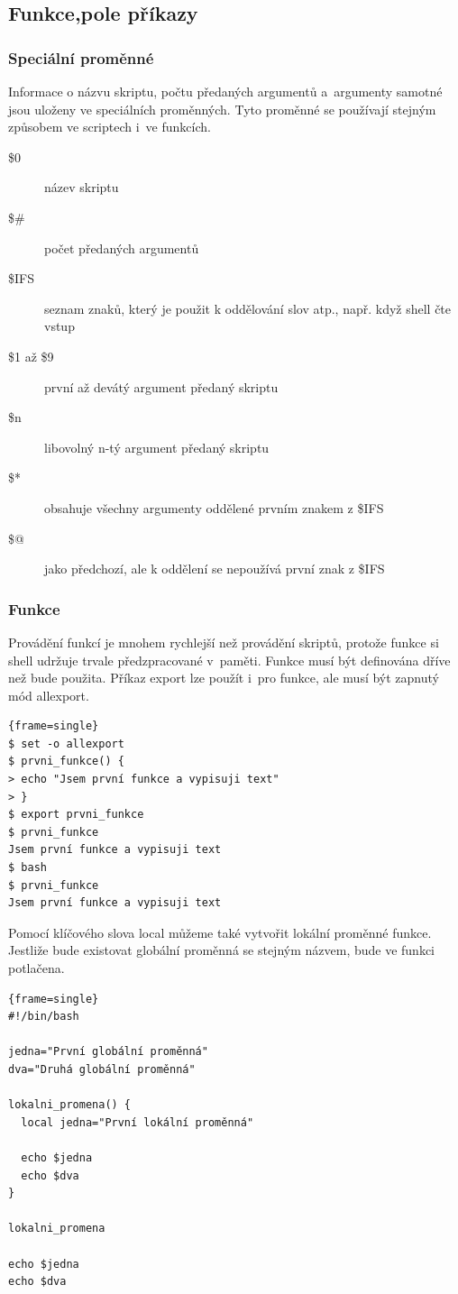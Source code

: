 \documentclass[a4paper,12pt]{article}
\newenvironment{codeframe}{%
  \begin{Sbox} 
    \begin{minipage} 
      {\columnwidth-\leftmargin-\rightmargin-2\fboxsep-2\fboxrule-4pt} 
}{%

  \end{minipage} 
  \end{Sbox} 
  \begin{center} 
    \fcolorbox{black}{codeback}{\TheSbox} 
  \end{center} 
}
\begin{document}
\subsection{Funkce,pole příkazy}
\subsubsection{Speciální proměnné}
Informace o názvu skriptu, počtu předaných argumentů a~argumenty samotné jsou uloženy ve speciálních proměnných. Tyto proměnné se používají stejným způsobem ve scriptech i~ve funkcích\cite{ABC_SBASH}.
\begin{description}
 \item[\$0] název skriptu
 \item[\$\#] počet předaných argumentů
 \item[\$IFS] seznam znaků, který je použit k oddělování slov atp., např. když shell čte vstup
 \item[\$1 až \$9] první až devátý argument předaný skriptu
 \item[\${n}] libovolný n-tý argument předaný skriptu
 \item[\$*] obsahuje všechny argumenty oddělené prvním znakem z \$IFS
 \item[\$@] jako předchozí, ale k oddělení se nepoužívá první znak z \$IFS
 \end{description}
\subsubsection{Funkce}
Provádění funkcí je mnohem rychlejší než provádění skriptů, protože funkce si shell udržuje trvale předzpracované v~paměti. Funkce musí být 
definována dříve než bude použita. Příkaz export lze použít i~pro funkce, ale musí být zapnutý mód allexport\cite{ABC_SBASH}.
    \begin{codeframe}
      \begin{Verbatim}{frame=single}
$ set -o allexport
$ prvni_funkce() {
> echo "Jsem první funkce a vypisuji text"
> }
$ export prvni_funkce
$ prvni_funkce
Jsem první funkce a vypisuji text
$ bash
$ prvni_funkce
Jsem první funkce a vypisuji text
\end{Verbatim} 
    \end{codeframe}
Pomocí klíčového slova local můžeme také vytvořit lokální proměnné funkce. Jestliže bude existovat globální proměnná se stejným názvem, bude ve funkci potlačena\cite{ABC_SBASH}.
    \begin{codeframe}
      \begin{Verbatim}{frame=single}
#!/bin/bash

jedna="První globální proměnná"
dva="Druhá globální proměnná"

lokalni_promena() {
  local jedna="První lokální proměnná"

  echo $jedna
  echo $dva
}

lokalni_promena

echo $jedna
echo $dva
\end{Verbatim} 
    \end{codeframe}
\end{document}
